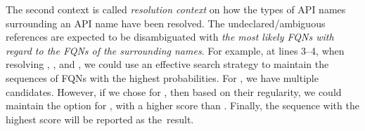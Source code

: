 %

The second context is called {\em resolution context} on how the types
of API names surrounding an API name have been resolved. The
undeclared/ambiguous references are expected to be disambiguated with
{\em the most likely FQNs with regard to the FQNs of the surrounding
  names}.
%
For example, at lines 3--4, when resolving ,
, and , we could use an effective
search strategy to maintain the sequences of FQNs with the highest
probabilities. For , we have multiple candidates. However,
if we chose  for ,
then based on their regularity, we could maintain the option
 for , with a
higher score than . Finally, the sequence
with the highest score will be reported as the~result.








